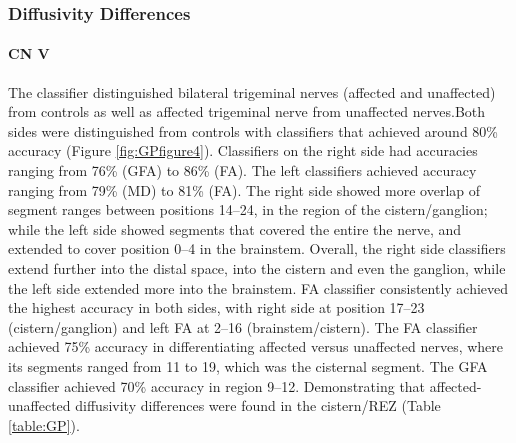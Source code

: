 \subsubsection{Diffusivity Differences}
\paragraph{CN V}
The classifier distinguished bilateral trigeminal nerves (affected and unaffected) from controls as well as affected trigeminal nerve from unaffected nerves.Both sides were distinguished from controls with classifiers that achieved around 80\% accuracy (Figure \ref{fig:GPfigure4}). 
Classifiers on the right side had accuracies ranging from 76\% (GFA) to 86\% (FA). The left classifiers achieved accuracy ranging from 79\% (MD) to 81\% (FA). The right side showed more overlap of segment ranges between positions 14--24, in the region of the cistern/ganglion; while the left side showed segments that covered the entire the nerve, and extended to cover position 0--4 in the brainstem. Overall, the right side classifiers extend further into the distal space, into the cistern and even the ganglion, while the left side extended more into the brainstem. FA classifier consistently achieved the highest accuracy in both sides, with right side at position 17--23 (cistern/ganglion) and left FA at 2--16 (brainstem/cistern).
The FA classifier achieved 75\% accuracy in differentiating affected versus unaffected nerves, where its segments ranged from 11 to 19, which was the cisternal segment. The GFA classifier achieved 70\% accuracy in region 9--12. Demonstrating that affected-unaffected diffusivity differences were found in the cistern/REZ (Table \ref{table:GP}).

